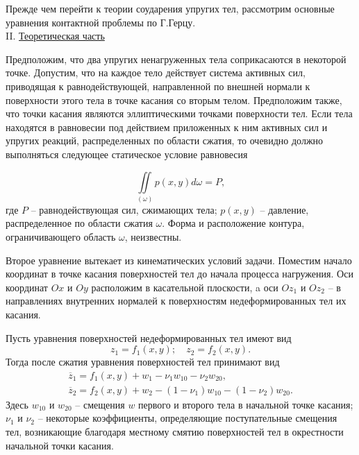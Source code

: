 \documentclass[specialist, subf, href, colorlinks=true, 14pt, final]{disser}
\theoremstyle{definition}
\newcommand{\npart}[2]{\noindent #1. \underline{#2}}
\begin{document}
Прежде чем перейти к теории соударения упругих тел, рассмотрим основные уравнения контактной проблемы по Г.Герцу.\\

\npart{II}{Теоретическая часть}

Предположим, что два упругих ненагруженных тела соприкасаются в некоторой точке. Допустим, что на каждое тело действует система активных сил, приводящая к равнодействующей, направленной по внешней нормали к поверхности этого тела в точке касания со вторым телом. Предположим также, что точки касания являются эллиптическими точками поверхности тел. Если тела находятся в равновесии под действием приложенных к ним активных сил и упругих реакций, распределенных по области сжатия, то очевидно должно выполняться следующее статическое условие равновесия
\addtocounter{equation}{1}
\begin{equation}\label{eq:261}
  \iint\limits_{(\omega)} p(x,y)d\omega = P,
  \tag{1}
\end{equation} 
где $P$ -- равнодействующая сил, сжимающих тела; $p(x,y)$ -- давление, распределенное по области сжатия $\omega$. Форма и расположение контура, ограничивающего область $\omega$, неизвестны.

Второе уравнение вытекает из кинематических условий задачи. Поместим начало координат в точке касания поверхностей тел до начала процесса нагружения. Оси координат $Ox$ и $Oy$ расположим в касательной плоскости, a оси $Oz_1$ и $Oz_2$ -- в направлениях внутренних нормалей к поверхностям недеформированных тел их касания.

Пусть уравнения поверхностей недеформированных тел имеют вид
\[
  z_{1} = f_{1}(x,y);\quad z_{2} = f_{2}(x,y).
\]
Тогда после сжатия уравнения поверхностей тел принимают вид
\[
  \begin{array}{l}
  \overline{z}_{1} = f_{1}(x,y) + w_{1} - \nu_{1}w_{10} - \nu_{2}w_{20},\\
  \overline{z}_{2} = f_{2}(x,y) + w_{2} - (1-\nu_{1})w_{10} - (1-\nu_{2})w_{20}.
  \end{array}
\]
Здесь $w_{10}$ и $w_{20}$ -- смещения $w$ первого и второго тела в начальной точке касания; $\nu_1$ и $\nu_2$ -- некоторые коэффициенты, определяющие поступательные смещения тел, возникающие благодаря местному смятию поверхностей тел в окрестности начальной точки касания.
\end{document}
